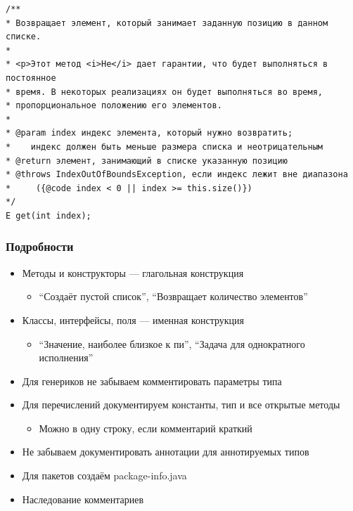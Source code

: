 \documentclass[xetex,mathserif,serif]{beamer}
\begin{document}
	\begin{frame}[fragile]
		\begin{footnotesize}
			\begin{verbatim}
/**
* Возвращает элемент, который занимает заданную позицию в данном списке.
*
* <р>Этот метод <i>He</i> дает гарантии, что будет выполняться в постоянное
* время. В некоторых реализациях он будет выполняться во время,
* пропорциональное положению его элементов.
*
* @param index индекс элемента, который нужно возвратить;
*    индекс должен быть меньше размера списка и неотрицательным
* @return элемент, занимающий в списке указанную позицию
* @throws IndexOutOfBoundsException, если индекс лежит вне диапазона
*     ({@code index < 0 || index >= this.size()})
*/
E get(int index);
			\end{verbatim}
		\end{footnotesize}
	\end{frame}

	\begin{frame}
		\frametitle{Подробности}
		\begin{itemize}
			\item Методы и конструкторы --- глагольная конструкция
			\begin{itemize}
				\item ``Создаёт пустой список'', ``Возвращает количество элементов''
			\end{itemize}
			\item Классы, интерфейсы, поля --- именная конструкция
			\begin{itemize}
				\item ``Значение, наиболее близкое к пи'', ``Задача для однократного исполнения''
			\end{itemize}
			\item Для генериков не забываем комментировать параметры типа
			\item Для перечислений документируем константы, тип и все открытые методы
			\begin{itemize}
				\item Можно в одну строку, если комментарий краткий
			\end{itemize}
			\item Не забываем документировать аннотации для аннотируемых типов
			\item Для пакетов создаём package-info.java
			\item Наследование комментариев
		\end{itemize}
	\end{frame}
\end{document}
